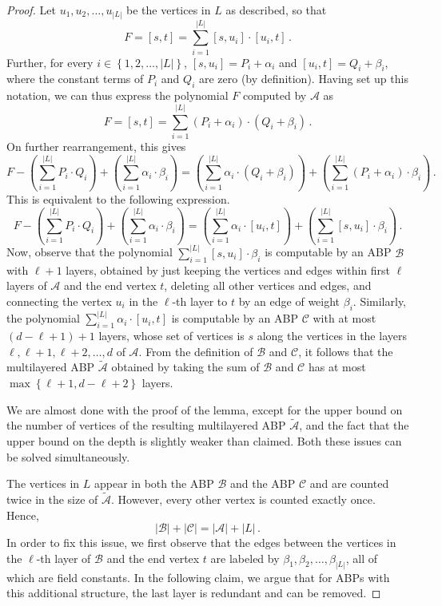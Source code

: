 \documentclass[10pt,a4paper]{article}
\newcommand{\set}[1]{\left\{#1\right\}}
\newcommand{\abs}[1]{\left|#1\right|}
\newcommand{\inparen}[1]{\left(#1\right)}
\begin{document}
\begin{proof}
	Let $u_1, u_2, \ldots, u_{|L|}$ be the vertices in $L$ as described, so that
	\[
		F = [s,t] = \sum_{i = 1}^{|L|} [s, u_{i}]\cdot [u_{i}, t] \, . 
	\]
	Further, for every $i \in \set{1, 2, \ldots, |L|}$, $[s,u_i] = P_i + \alpha_i$ and $[u_i,t] = Q_i + \beta_i$, where the constant terms of $P_i$ and $Q_i$ are zero (by definition). Having set up this notation, we can thus express the polynomial $F$ computed by $\mathcal{A}$ as 
	\[
		F = [s,t] = \sum_{i = 1}^{|L|} (P_i + \alpha_i)\cdot (Q_i + \beta_i) \, .
	\]
	On further rearrangement, this gives 
	\[
		F - \inparen{\sum_{i = 1}^{|L|} P_i \cdot Q_i} + \inparen{\sum_{i = 1}^{|L|} \alpha_i\cdot \beta_i} = \inparen{\sum_{i = 1}^{|L|} \alpha_i \cdot (Q_i + \beta_i)} + \inparen{\sum_{i = 1}^{|L|} (P_i + \alpha_i)\cdot \beta_i} \, .
	\] 
	This is equivalent to the following expression.
	\[
		F - \inparen{\sum_{i = 1}^{|L|} P_i \cdot Q_i} + \inparen{\sum_{i = 1}^{|L|} \alpha_i\cdot \beta_i} =  \inparen{\sum_{i = 1}^{|L|} \alpha_i\cdot [u_i, t]} + \inparen{\sum_{i = 1}^{|L|} [s, u_i]\cdot \beta_i} \, .
	\] 
	Now, observe that the polynomial $\sum_{i=1}^{|L|} [s, u_i] \cdot \beta_i$ is computable by an ABP $\mathcal{B}$ with $\ell+1$ layers, obtained by just keeping the vertices and edges within first $\ell$ layers of $\mathcal{A}$ and the end vertex $t$, deleting all other vertices and edges, and connecting the vertex $u_i$ in the $\ell$-th layer to $t$ by an edge of weight $\beta_i$.  
	Similarly, the polynomial $\sum_{i=1}^{|L|} \alpha_i\cdot [u_i, t]$ is computable by an ABP $\mathcal{C}$ with at most $(d-\ell + 1)+1$ layers,  whose set of vertices is $s$ along the vertices in the layers $\ell, \ell + 1, \ell+2, \ldots, d$ of $\mathcal {A}$. From the definition of $\mathcal{B}$ and $\mathcal{C}$, it follows that the multilayered ABP $\tilde{\mathcal{A}}$ obtained by taking the sum of $\mathcal{B}$ and $\mathcal{C}$ has at most $\max\set{\ell+1, d-\ell+2}$ layers. 
		
	We are almost done with the proof of the lemma, except for the upper bound on the number of vertices of the resulting multilayered ABP $\tilde{\mathcal{A}}$, and the fact that the upper bound on the depth is slightly weaker than claimed. Both these issues can be solved simultaneously.
	
	 The vertices in $L$ appear in both the ABP $\mathcal{B}$ and the ABP $\mathcal{C}$ and are counted twice in the size of $\tilde{\mathcal{A}}$. However, every other vertex is counted exactly once.  Hence, 
	\begin{equation}\label{eqn:overlap}
		\abs{\mathcal{B}} + \abs{\mathcal{C}} =  \abs{\mathcal{A}} + \abs{L} \, .
	\end{equation}
 	In order to fix this issue, we first observe that the edges between the vertices in the $\ell$-th layer of $\mathcal{B}$ and the end vertex $t$ are labeled by $\beta_{1}, \beta_2, \ldots, \beta_{|L|}$, all of which are field constants. In the following claim, we argue that for ABPs with this additional structure, the last layer is redundant and can be removed.


\end{proof}
\end{document}

